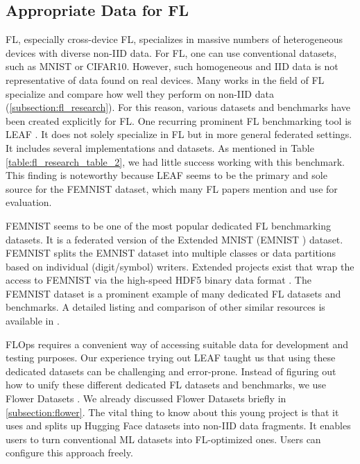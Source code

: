 \subsection{Appropriate Data for FL}

FL, especially cross-device FL, specializes in massive numbers of heterogeneous devices with diverse non-IID data.
For FL, one can use conventional datasets, such as MNIST or CIFAR10.
However, such homogeneous and IID data is not representative of data found on real devices.
Many works in the field of FL specialize and compare how well they perform on non-IID data (\ref{subsection:fl_research}).
For this reason, various datasets and benchmarks have been created explicitly for FL.
One recurring prominent FL benchmarking tool is LEAF \cite{paper:leaf_fl_benchmark}.
It does not solely specialize in FL but in more general federated settings.
It includes several implementations and datasets.
As mentioned in Table \ref{table:fl_research_table_2}, we had little success working with this benchmark.
This finding is noteworthy because LEAF seems to be the primary and sole source for the FEMNIST dataset, which many FL papers mention and use for evaluation.

FEMNIST seems to be one of the most popular dedicated FL benchmarking datasets.
It is a federated version of the Extended MNIST (EMNIST \cite{emnist_dataset}) dataset.
FEMNIST splits the EMNIST dataset into multiple classes or data partitions based on individual (digit/symbol) writers.
Extended projects exist that wrap the access to FEMNIST via the high-speed HDF5 binary data format \cite{hdf5_femnist}.
The FEMNIST dataset is a prominent example of many dedicated FL datasets and benchmarks.
A detailed listing and comparison of other similar resources is available in \cite{thesis:tum_fl_framework_comparison}.

FLOps requires a convenient way of accessing suitable data for development and testing purposes.
Our experience trying out LEAF taught us that using these dedicated datasets can be challenging and error-prone.
Instead of figuring out how to unify these different dedicated FL datasets and benchmarks, we use Flower Datasets \cite{flower:datasets}.
We already discussed Flower Datasets briefly in \ref{subsection:flower}.
The vital thing to know about this young project is that it uses and splits up Hugging Face datasets into non-IID data fragments.
It enables users to turn conventional ML datasets into FL-optimized ones.
Users can configure this approach freely.